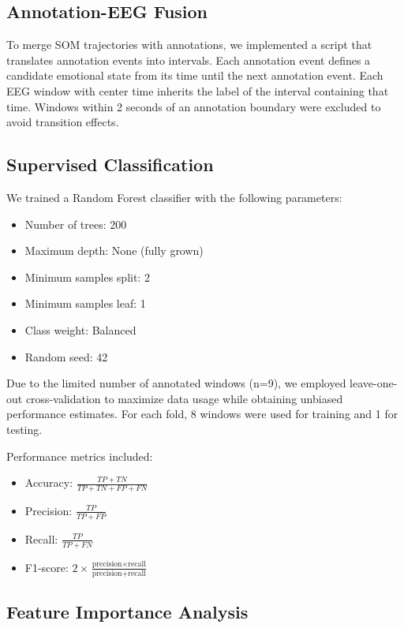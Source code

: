 \subsection{Annotation-EEG Fusion}

To merge SOM trajectories with annotations, we implemented a script that translates annotation events into intervals. Each annotation event defines a candidate emotional state from its time until the next annotation event. Each EEG window with center time inherits the label of the interval containing that time. Windows within 2 seconds of an annotation boundary were excluded to avoid transition effects.

\subsection{Supervised Classification}

We trained a Random Forest classifier with the following parameters:
\begin{itemize}
    \item Number of trees: 200
    \item Maximum depth: None (fully grown)
    \item Minimum samples split: 2
    \item Minimum samples leaf: 1
    \item Class weight: Balanced
    \item Random seed: 42
\end{itemize}

Due to the limited number of annotated windows (n=9), we employed leave-one-out cross-validation to maximize data usage while obtaining unbiased performance estimates. For each fold, 8 windows were used for training and 1 for testing.

Performance metrics included:
\begin{itemize}
    \item Accuracy: $\frac{TP + TN}{TP + TN + FP + FN}$
    \item Precision: $\frac{TP}{TP + FP}$
    \item Recall: $\frac{TP}{TP + FN}$
    \item F1-score: $2 \times \frac{\text{precision} \times \text{recall}}{\text{precision} + \text{recall}}$
\end{itemize}

\subsection{Feature Importance Analysis}


